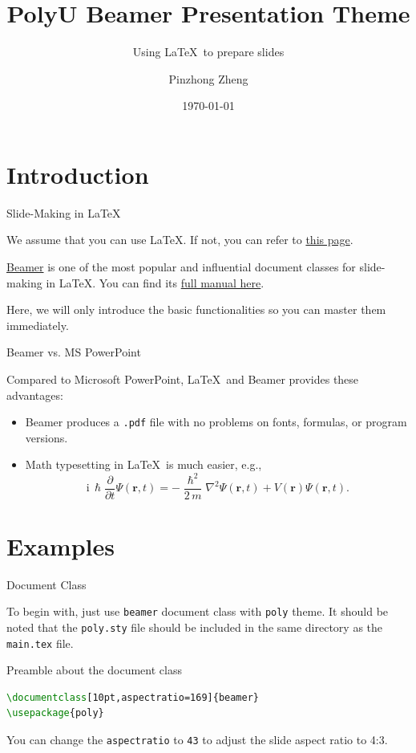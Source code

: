 \documentclass[10pt,aspectratio=169]{beamer}
\title{PolyU Beamer Presentation Theme}
\subtitle{Using \LaTeX\ to prepare slides}
\author{Pinzhong Zheng}
\institute[AMA]{Department of Applied Mathematics}
\date{\today}
\begin{document}
\maketitle %

\section{Introduction}

\begin{frame}{Slide-Making in \LaTeX}

	We assume that you can use \LaTeX. If not, you can refer to \href{https://www.overleaf.com/learn/latex/Learn_LaTeX_in_30_minutes}{this page}.

	\href{https://www.overleaf.com/learn/latex/Beamer}{Beamer} is one of the most popular and influential document classes for slide-making in \LaTeX. You can find its \href{https://mirror-hk.koddos.net/CTAN/macros/latex/contrib/beamer/doc/beameruserguide.pdf}{full manual here}.

	Here, we will only introduce the basic functionalities so you can master them immediately.
\end{frame}


\begin{frame}{Beamer vs. MS PowerPoint}

	Compared to Microsoft PowerPoint, \LaTeX\ and Beamer provides these advantages:
	
	\begin{itemize}
		\item Beamer produces a \texttt{.pdf} file with no problems on fonts, formulas, or program versions.
		\item Math typesetting in \LaTeX\ is much easier, e.g.,
			\begin{equation*}
				\mathrm{i}\,\hslash\frac{\partial}{\partial t} \Psi(\mathbf{r},t) =
				-\frac{\hslash^2}{2\,m}\nabla^2\Psi(\mathbf{r},t)
				+ V(\mathbf{r})\Psi(\mathbf{r},t).
			\end{equation*}
	\end{itemize}
\end{frame}

\section{Examples}

\begin{frame}[fragile]{Document Class}

	To begin with, just use \texttt{beamer} document class with \texttt{poly} theme. It should be noted that the \texttt{poly.sty} file should be included in the same directory as the \texttt{main.tex} file.
	
\begin{block}{Preamble about the document class}
\begin{lstlisting}[language=TeX]
\documentclass[10pt,aspectratio=169]{beamer}
\usepackage{poly}
\end{lstlisting}
\end{block}
	
	You can change the \texttt{aspectratio} to \texttt{43} to adjust the slide aspect ratio to 4:3.
\end{frame}
\end{document}

